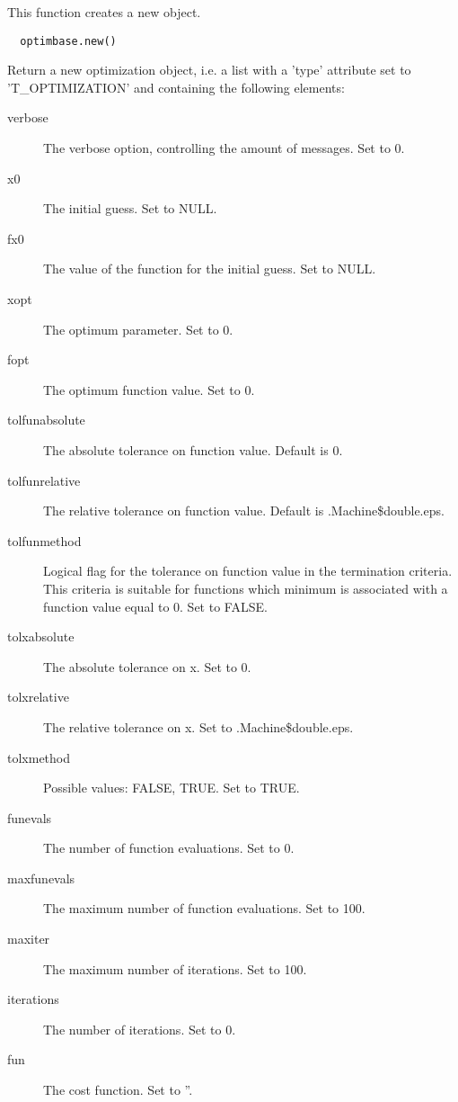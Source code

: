 %
\begin{Description}\relax
This function creates a new object. 
\end{Description}
%
\begin{Usage}
\begin{verbatim}
  optimbase.new()
\end{verbatim}
\end{Usage}
%
\begin{Value}
Return a new optimization object, i.e. a list with a 'type' attribute set to
'T\_OPTIMIZATION' and containing the following elements:\begin{description}

\item[verbose] The verbose option, controlling the amount of messages.
Set to 0.
\item[x0] The initial guess. Set to NULL.
\item[fx0] The value of the function for the initial guess. Set to
NULL.
\item[xopt] The optimum parameter. Set to 0.
\item[fopt] The optimum function value. Set to 0.
\item[tolfunabsolute] The absolute tolerance on function value. Default
is 0.
\item[tolfunrelative] The relative tolerance on function value. Default
is .Machine\$double.eps.
\item[tolfunmethod] Logical flag for the tolerance on function value in
the termination criteria. This criteria is suitable for functions which
minimum is associated with a function value equal to 0. Set to FALSE.
\item[tolxabsolute] The absolute tolerance on x. Set to 0.
\item[tolxrelative] The relative tolerance on x. Set to
.Machine\$double.eps.
\item[tolxmethod] Possible values: FALSE, TRUE. Set to TRUE.
\item[funevals] The number of function evaluations. Set to 0.
\item[maxfunevals] The maximum number of function evaluations. Set to
100.
\item[maxiter] The maximum number of iterations. Set to 100.
\item[iterations] The number of iterations. Set to 0.
\item[fun] The cost function. Set to ''.

\end{description}
\end{Value}
